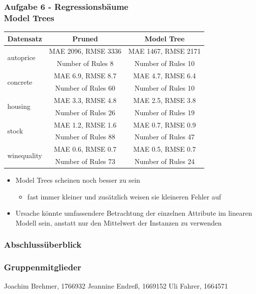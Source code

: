 \documentclass[accentcolor=tud6b,colorbacktitle,inverttitle,landscape,german,presentation,t]{tudbeamer}
\begin{document}
    \begin{frame}[t]
    \frametitle{Aufgabe 6 - Regressionsbäume\\ Model Trees}
        \begin{tabular}[htbp]{l||c|c}
            Datensatz & Pruned & Model Tree \\
            \hline
            \hline
            \multirow{2}{*}{autoprice} & MAE 2096, RMSE 3336 & MAE 1467, RMSE 2171 \\
            & Number of Rules 8 & Number of Rules 10\\
            \hline
            \multirow{2}{*}{concrete} & MAE 6.9, RMSE 8.7 & MAE 4.7, RMSE 6.4 \\
            & Number of Rules 60 & Number of Rules 10 \\
            \hline
            \multirow{2}{*}{housing} & MAE 3.3, RMSE 4.8 & MAE 2.5, RMSE 3.8 \\
            & Number of Rules 26 & Number of Rules 19 \\
            \hline
            \multirow{2}{*}{stock} & MAE 1.2, RMSE 1.6 & MAE 0.7, RMSE 0.9 \\
            & Number of Rules 88 & Number of Rules 47 \\
            \hline
            \multirow{2}{*}{winequality} & MAE 0.6, RMSE 0.7 & MAE 0.5, RMSE 0.7 \\
            & Number of Rules 73 & Number of Rules 24\\
        \end{tabular}
        \vfill
\begin{itemize}
        \item Model Trees scheinen noch besser zu sein
\begin{itemize}
\item fast immer kleiner und zusätzlich weisen sie kleineren Fehler auf
\end{itemize}
        \item Ursache könnte umfassendere Betrachtung der einzelnen Attribute im linearen Modell sein, anstatt nur den Mittelwert der Instanzen zu verwenden
\end{itemize}
    \end{frame}
    
\begin{frame}
\frametitle{Abschlussüberblick}
\tableofcontents
\begin{center}
\end{center}
\end{frame}

\begin{frame}
\frametitle{Gruppenmitglieder}
Joachim Brehmer, 1766932  \vfill
Jeannine Endreß, 1669152 \vfill
Uli Fahrer, 1664571
\end{frame}
\end{document}
